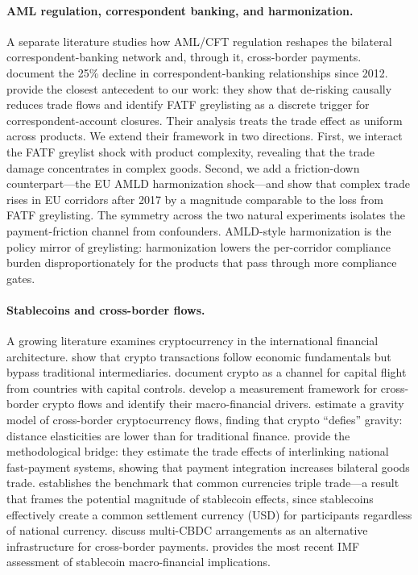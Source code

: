 \paragraph{AML regulation, correspondent banking, and harmonization.}
A separate literature studies how AML/CFT regulation reshapes the bilateral correspondent-banking network and, through it, cross-border payments. \citet{Rice2020_correspondent} document the 25\% decline in correspondent-banking relationships since 2012. \citet{Borchert2024_broken_relationships} provide the closest antecedent to our work: they show that de-risking causally reduces trade flows and identify FATF greylisting as a discrete trigger for correspondent-account closures. Their analysis treats the trade effect as uniform across products. We extend their framework in two directions. First, we interact the FATF greylist shock with product complexity, revealing that the trade damage concentrates in complex goods. Second, we add a friction-down counterpart---the EU AMLD harmonization shock---and show that complex trade rises in EU corridors after 2017 by a magnitude comparable to the loss from FATF greylisting. The symmetry across the two natural experiments isolates the payment-friction channel from confounders. AMLD-style harmonization is the policy mirror of greylisting: harmonization lowers the per-corridor compliance burden disproportionately for the products that pass through more compliance gates.

\paragraph{Stablecoins and cross-border flows.}
A growing literature examines cryptocurrency in the international financial architecture. \citet{GrafvonLuckner2023_capital_flows} show that crypto transactions follow economic fundamentals but bypass traditional intermediaries. \citet{GrafvonLuckner2024_capital_flight} document crypto as a channel for capital flight from countries with capital controls. \citet{Cerutti2024_crypto_flows} develop a measurement framework for cross-border crypto flows and identify their macro-financial drivers. \citet{Auer2025_defiying_gravity} estimate a gravity model of cross-border cryptocurrency flows, finding that crypto ``defies'' gravity: distance elasticities are lower than for traditional finance. \citet{FerrarMinesso2026_payment_links} provide the methodological bridge: they estimate the trade effects of interlinking national fast-payment systems, showing that payment integration increases bilateral goods trade. \citet{Rose2000_one_money} establishes the benchmark that common currencies triple trade---a result that frames the potential magnitude of stablecoin effects, since stablecoins effectively create a common settlement currency (USD) for participants regardless of national currency. \citet{Auer2021_multi_cbdc} discuss multi-CBDC arrangements as an alternative infrastructure for cross-border payments. \citet{IMF2025_stablecoins} provides the most recent IMF assessment of stablecoin macro-financial implications.

